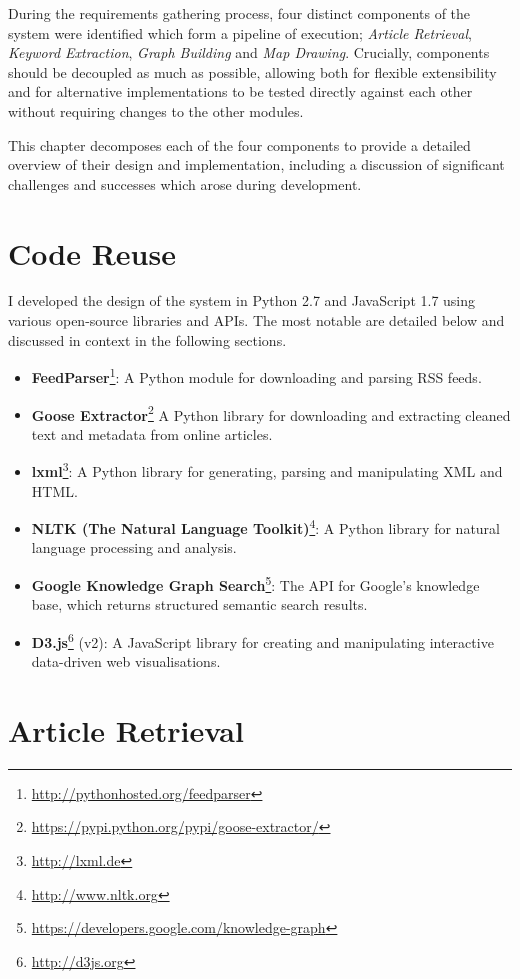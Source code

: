During the requirements gathering process, four distinct components of the system were identified which form a pipeline of execution; \textit{Article Retrieval}, \textit{Keyword Extraction}, \textit{Graph Building} and \textit{Map Drawing}. Crucially, components should be decoupled as much as possible, allowing both for flexible extensibility and for alternative implementations to be tested directly against each other without requiring changes to the other modules.

This chapter decomposes each of the four components to provide a detailed overview of their design and implementation, including a discussion of significant challenges and successes which arose during development.

\section{Code Reuse}
I developed the design of the system in Python 2.7 and JavaScript 1.7 using various open-source libraries and APIs. The most notable are detailed below and discussed in context in the following sections.
\begin{itemize}[itemsep=0.1em]
	\item\textbf{FeedParser}\footnote{\url{http://pythonhosted.org/feedparser}}: A Python module for downloading and parsing RSS feeds.
	\item\textbf{Goose Extractor}\footnote{\url{https://pypi.python.org/pypi/goose-extractor/}} A Python library for downloading and extracting cleaned text and metadata from online articles. 
	\item\textbf{lxml}\footnote{\url{http://lxml.de}}: A Python library for generating, parsing and manipulating XML and HTML.
	\item\textbf{NLTK (The Natural Language Toolkit)}\footnote{\url{http://www.nltk.org}}: A Python library for natural language processing and analysis.
	\item\textbf{Google Knowledge Graph Search}\footnote{\url{https://developers.google.com/knowledge-graph}}: The API for Google's knowledge base, which returns structured semantic search results.
	\item\textbf{D3.js}\footnote{\url{http://d3js.org}} (v2): A JavaScript library for creating and manipulating interactive data-driven web visualisations.
\end{itemize}

\section{Article Retrieval}


